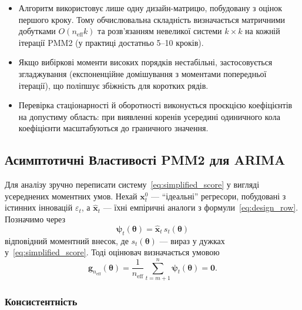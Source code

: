 \documentclass[12pt,a4paper]{article}
\begin{document}
\begin{itemize}
    \item Алгоритм використовує лише одну дизайн-матрицю, побудовану з оцінок першого кроку. Тому обчислювальна складність визначається матричними добутками $O(n_\text{eff} k)$ та розв'язанням невеликої системи $k \times k$ на кожній ітерації PMM2 (у практиці достатньо 5--10 кроків).
    \item Якщо вибіркові моменти високих порядків нестабільні, застосовується згладжування (експоненційне домішування з моментами попередньої ітерації), що поліпшує збіжність для коротких рядів.
    \item Перевірка стаціонарності й оборотності виконується проєкцією коефіцієнтів на допустиму область: при виявленні коренів усередині одиничного кола коефіцієнти масштабуються до граничного значення.
\end{itemize}

\subsection{Асимптотичні Властивості PMM2 для ARIMA}
\label{subsec:asymptotic_theory}

Для аналізу зручно переписати систему~\eqref{eq:simplified_score} у вигляді усереднених моментних умов. Нехай $\mathbf{x}_t^0$ --- ``ідеальні'' регресори, побудовані з істинних інновацій $\varepsilon_t$, а $\widehat{\mathbf{x}}_t$ --- їхні емпіричні аналоги з формули~\eqref{eq:design_row}. Позначимо через
\[
\boldsymbol{\psi}_t(\boldsymbol{\theta}) = \widehat{\mathbf{x}}_t\, s_t(\boldsymbol{\theta})
\]
відповідний моментний внесок, де $s_t(\boldsymbol{\theta})$ --- вираз у дужках у~\eqref{eq:simplified_score}. Тоді оцінювач визначається умовою
\[
\mathbf{g}_{n_\text{eff}}(\boldsymbol{\theta}) =
\frac{1}{n_\text{eff}}\sum_{t=m+1}^{n} \boldsymbol{\psi}_t(\boldsymbol{\theta}) = \mathbf{0}.
\]

\subsubsection{Консистентність}
\end{document}
